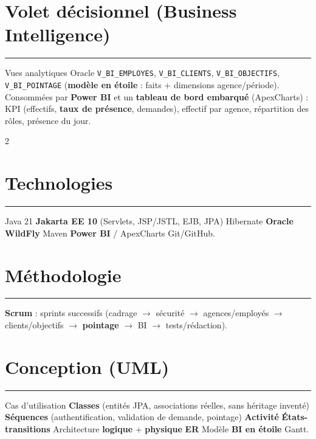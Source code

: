 \documentclass[10pt,a4paper]{article}
\newcommand{\rulecyan}{\par\vspace{-3pt}\textcolor{btkcyan}{\rule{\linewidth}{1pt}}\par\vspace{2pt}}
\begin{document}
\section{Volet décisionnel (Business Intelligence)}\rulecyan
Vues analytiques Oracle \texttt{V\_BI\_EMPLOYES}, \texttt{V\_BI\_CLIENTS},
\texttt{V\_BI\_OBJECTIFS}, \texttt{V\_BI\_POINTAGE} (\textbf{modèle en étoile} :
faits + dimensions agence/période). Consommées par \textbf{Power BI} et un
\textbf{tableau de bord embarqué} (ApexCharts) : KPI (effectifs, \textbf{taux de
présence}, demandes), effectif par agence, répartition des rôles, présence du jour.

\begin{multicols}{2}
\section{Technologies}\rulecyan
Java 21 \textbar{} \textbf{Jakarta EE 10} (Servlets, JSP/JSTL, EJB, JPA) \textbar{}
Hibernate \textbar{} \textbf{Oracle} \textbar{} \textbf{WildFly} \textbar{} Maven
\textbar{} \textbf{Power BI} / ApexCharts \textbar{} Git/GitHub.

\section{Méthodologie}\rulecyan
\textbf{Scrum} : sprints successifs (cadrage $\rightarrow$ sécurité $\rightarrow$
agences/employés $\rightarrow$ clients/objectifs $\rightarrow$ \textbf{pointage}
$\rightarrow$ BI $\rightarrow$ tests/rédaction).
\end{multicols}

\section{Conception (UML)}\rulecyan
Cas d'utilisation \textbar{} \textbf{Classes} (entités JPA, associations réelles,
sans héritage inventé) \textbar{} \textbf{Séquences} (authentification, validation
de demande, pointage) \textbar{} \textbf{Activité} \textbar{} \textbf{États-transitions}
\textbar{} Architecture \textbf{logique} + \textbf{physique} \textbar{} \textbf{ER}
\textbar{} Modèle \textbf{BI en étoile} \textbar{} Gantt.
\end{document}
